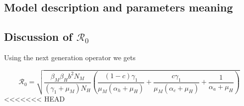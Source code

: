 \subsection{Model description and parameters meaning}
	
\subsection{Discussion of $\mathcal{R}_0$}
	Using the next generation operator we gets
	
	\begin{equation}
		\mathcal{R}_0 =
			\sqrt{
				\frac{\beta_M \beta_H b^2 N_M}{(\gamma_1 + \mu_M) N_H }
				\left(
					\frac{(1-c)\gamma_1}{\mu_M (\alpha_h + \mu_H)}+
					\frac{c \gamma_1}{\mu_M (\alpha_c + \mu_H)}+
					\frac{1}{ \alpha_a + \mu_H}
				\right)
			}
	\end{equation}
<<<<<<< HEAD
